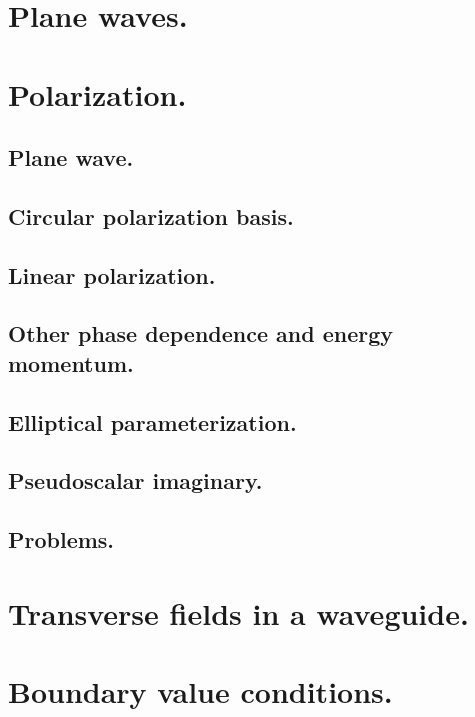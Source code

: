      \section{Plane waves.}
         
      \section{Polarization.}
         \subsection{Plane wave.}
            
         \subsection{Circular polarization basis.}
            
         \subsection{Linear polarization.}
            
         \subsection{Other phase dependence and energy momentum.}
            
         \subsection{Elliptical parameterization.}
            
         \subsection{Pseudoscalar imaginary.}
            
         \subsection{Problems.}
            
      \section{Transverse fields in a waveguide.}
         
      \section{Boundary value conditions.}
         
